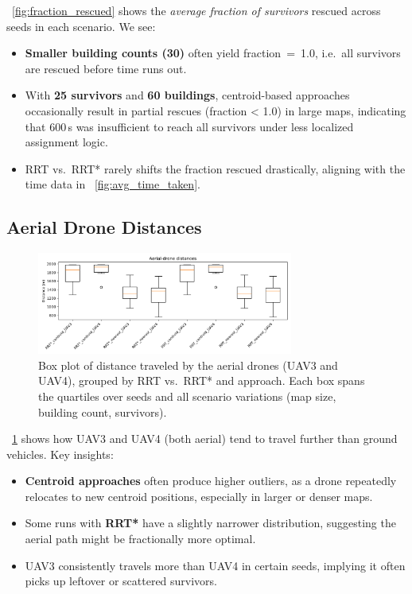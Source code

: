 \documentclass[12pt,a4paper]{report}
\begin{document}
\noindent
\figurename~\ref{fig:fraction_rescued} shows the \emph{average fraction of survivors}
rescued across seeds in each scenario. We see:
\begin{itemize}
    \item \textbf{Smaller building counts (30)} often yield fraction~=~1.0,
          i.e.\ all survivors are rescued before time runs out.
    \item With \textbf{25 survivors} and \textbf{60 buildings}, centroid-based approaches 
          occasionally result in partial rescues (fraction < 1.0) in large maps, 
          indicating that 600\,s was insufficient to reach all survivors under 
          less localized assignment logic.
    \item RRT vs.\ RRT* rarely shifts the fraction rescued drastically, 
          aligning with the time data in \figurename~\ref{fig:avg_time_taken}.
\end{itemize}

\subsection{Aerial Drone Distances}
\begin{figure}[H]
    \centering
    \includegraphics[width=0.75\textwidth]{figures/aerial_distance_box.png}
    \caption{Box plot of distance traveled by the aerial drones (UAV3 and UAV4), 
             grouped by RRT vs.\ RRT* and approach. Each box spans the quartiles 
             over seeds and all scenario variations (map size, building count, survivors).}
    \label{fig:aerial_distance_box}
\end{figure}

\noindent
\figurename~\ref{fig:aerial_distance_box} shows how UAV3 and UAV4 (both aerial) 
tend to travel further than ground vehicles. Key insights:
\begin{itemize}
    \item \textbf{Centroid approaches} often produce higher outliers, as a drone 
          repeatedly relocates to new centroid positions, especially in larger or denser maps.
    \item Some runs with \textbf{RRT*} have a slightly narrower distribution, 
          suggesting the aerial path might be fractionally more optimal.
    \item UAV3 consistently travels more than UAV4 in certain seeds, implying it 
          often picks up leftover or scattered survivors.
\end{itemize}
\end{document}
